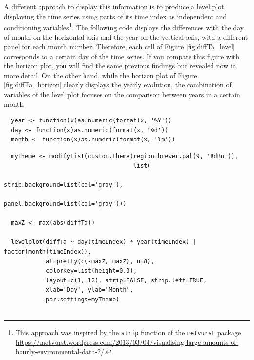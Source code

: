 \documentclass[smallroyalvopaper]{memoir}
\begin{document}
A different approach to display this information is to produce a level
plot displaying the time series using parts of its time index as
independent and conditioning variables\footnote{This approach was inspired by the \texttt{strip} function of the
\texttt{metvurst} package
\url{https://metvurst.wordpress.com/2013/03/04/visualising-large-amounts-of-hourly-environmental-data-2/}.}. The following code
displays the differences with the day of month on the horizontal axis
and the year on the vertical axis, with a different panel for each
month number. Therefore, each cell of Figure \ref{fig:diffTa_level}
corresponds to a certain day of the time series. If you compare this
figure with the horizon plot, you will find the same previous findings
but revealed now in more detail. On the other hand, while the horizon
plot of Figure \ref{fig:diffTa_horizon} clearly displays the yearly
evolution, the combination of variables of the level plot focuses on
the comparison between years in a certain month.

\lstset{language=r,label= ,caption= ,captionpos=b,numbers=none}
\begin{lstlisting}
  year <- function(x)as.numeric(format(x, '%Y'))
  day <- function(x)as.numeric(format(x, '%d'))
  month <- function(x)as.numeric(format(x, '%m'))
\end{lstlisting}

\lstset{language=r,label= ,caption= ,captionpos=b,numbers=none}
\begin{lstlisting}
  myTheme <- modifyList(custom.theme(region=brewer.pal(9, 'RdBu')),
                                     list(
                                       strip.background=list(col='gray'),
                                       panel.background=list(col='gray')))
  
  maxZ <- max(abs(diffTa))
  
  levelplot(diffTa ~ day(timeIndex) * year(timeIndex) | factor(month(timeIndex)),
            at=pretty(c(-maxZ, maxZ), n=8),
            colorkey=list(height=0.3),
            layout=c(1, 12), strip=FALSE, strip.left=TRUE,
            xlab='Day', ylab='Month', 
            par.settings=myTheme)
  
\end{lstlisting}
\end{document}
